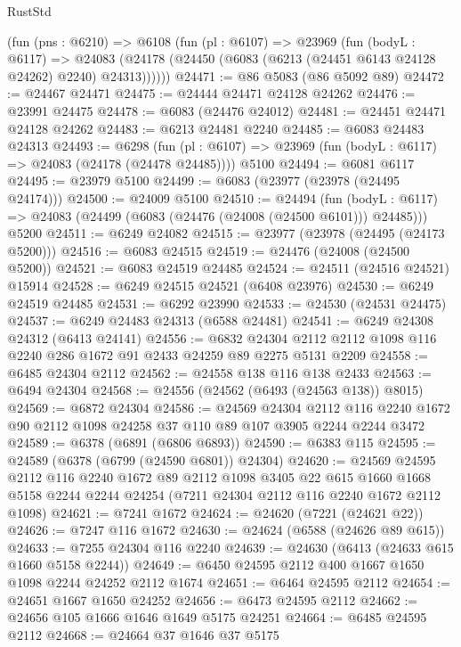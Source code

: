 \begin{lexlean}{RustStd}
\begin{coremodule}
    (fun (pns : @6210) =>
    @6108
      (fun (pl : @6107) =>
      @23969
        (fun (bodyL : @6117) =>
        @24083 (@24178 (@24450 (@6083 (@6213 (@24451 @6143 @24128 @24262) @2240) @24313))))))
@24471 := @86 @5083 (@86 @5092 @89)
@24472 := @24467 @24471
@24475 := @24444 @24471 @24128 @24262
@24476 := @23991 @24475
@24478 := @6083 (@24476 @24012)
@24481 := @24451 @24471 @24128 @24262
@24483 := @6213 @24481 @2240
@24485 := @6083 @24483 @24313
@24493 := @6298
    (fun (pl : @6107) => @23969 (fun (bodyL : @6117) => @24083 (@24178 (@24478 @24485))))
    @5100
@24494 := @6081 @6117
@24495 := @23979 @5100
@24499 := @6083 (@23977 (@23978 (@24495 @24174)))
@24500 := @24009 @5100
@24510 := @24494
    (fun (bodyL : @6117) => @24083 (@24499 (@6083 (@24476 (@24008 (@24500 @6101))) @24485)))
    @5200
@24511 := @6249 @24082
@24515 := @23977 (@23978 (@24495 (@24173 @5200)))
@24516 := @6083 @24515
@24519 := @24476 (@24008 (@24500 @5200))
@24521 := @6083 @24519 @24485
@24524 := @24511 (@24516 @24521) @15914
@24528 := @6249 @24515 @24521 (@6408 @23976)
@24530 := @6249 @24519 @24485
@24531 := @6292 @23990
@24533 := @24530 (@24531 @24475)
@24537 := @6249 @24483 @24313 (@6588 @24481)
@24541 := @6249 @24308 @24312 (@6413 @24141)
@24556 := @6832
    @24304
    @2112
    @2112
    @1098
    @116
    @2240
    @286
    @1672
    @91
    @2433
    @24259
    @89
    @2275
    @5131
    @2209
@24558 := @6485 @24304 @2112
@24562 := @24558 @138 @116 @138 @2433
@24563 := @6494 @24304
@24568 := @24556 (@24562 (@6493 (@24563 @138)) @8015)
@24569 := @6872 @24304
@24586 := @24569
    @24304
    @2112
    @116
    @2240
    @1672
    @90
    @2112
    @1098
    @24258
    @37
    @110
    @89
    @107
    @3905
    @2244
    @2244
    @3472
@24589 := @6378 (@6891 (@6806 @6893))
@24590 := @6383 @115
@24595 := @24589 (@6378 (@6799 (@24590 @6801)) @24304)
@24620 := @24569
    @24595
    @2112
    @116
    @2240
    @1672
    @89
    @2112
    @1098
    @3405
    @22
    @615
    @1660
    @1668
    @5158
    @2244
    @2244
    @24254
    (@7211 @24304 @2112 @116 @2240 @1672 @2112 @1098)
@24621 := @7241 @1672
@24624 := @24620 (@7221 (@24621 @22))
@24626 := @7247 @116 @1672
@24630 := @24624 (@6588 (@24626 @89 @615))
@24633 := @7255 @24304 @116 @2240
@24639 := @24630 (@6413 (@24633 @615 @1660 @5158 @2244))
@24649 := @6450 @24595 @2112 @400 @1667 @1650 @1098 @2244 @24252 @2112 @1674
@24651 := @6464 @24595 @2112
@24654 := @24651 @1667 @1650 @24252
@24656 := @6473 @24595 @2112
@24662 := @24656 @105 @1666 @1646 @1649 @5175 @24251
@24664 := @6485 @24595 @2112
@24668 := @24664 @37 @1646 @37 @5175

\end{coremodule}
\end{lexlean}

